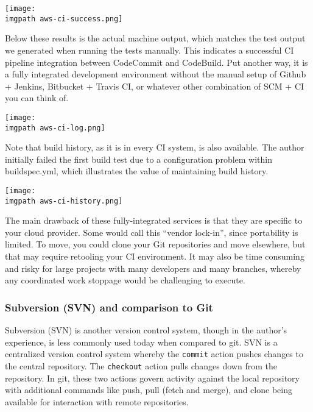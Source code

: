     \begin{minipage}[t]{\linewidth}
	  \centering
      \texttt{[image: \\imgpath aws-ci-success.png]}
    \end{minipage}

Below these results is the actual machine output, which matches the test
output we generated when running the tests manually. This indicates a
successful CI pipeline integration between CodeCommit and CodeBuild. Put
another way, it is a fully integrated development environment without the
manual setup of Github + Jenkins, Bitbucket + Travis CI, or whatever other
combination of SCM + CI you can think of.

    \begin{minipage}[t]{\linewidth}
	  \centering
      \texttt{[image: \\imgpath aws-ci-log.png]}
    \end{minipage}

Note that build history, as it is in every CI system, is also available. The
author initially failed the first build test due to a configuration problem
within buildspec.yml, which illustrates the value of maintaining build
history.

    \begin{minipage}[t]{\linewidth}
	  \centering
      \texttt{[image: \\imgpath aws-ci-history.png]}
    \end{minipage}

The main drawback of these fully-integrated services is that they are specific
to your cloud provider. Some would call this ``vendor lock-in'', since
portability is limited. To move, you could clone your Git repositories and
move elsewhere, but that may require retooling your CI environment. It may
also be time consuming and risky for large projects with many developers and
many branches, whereby any coordinated work stoppage would be challenging to execute.

\subsubsection{Subversion (SVN) and comparison to Git}
Subversion (SVN) is another version control system, though in the author's
experience, is less commonly used today when compared to git. SVN is a
centralized version control system whereby the \verb|commit| action pushes
changes to the central repository. The \verb|checkout| action pulls changes
down from the repository. In git, these two actions govern activity against
the local repository with additional commands like push, pull (fetch and
merge), and clone being available for interaction with remote repositories. \\

